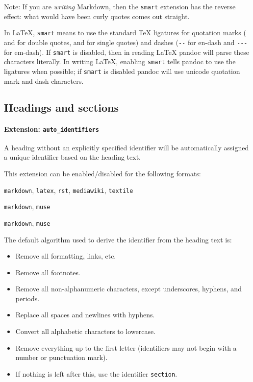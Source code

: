 \documentclass[
  a4paper,
]{article}
\providecommand{\tightlist}{%
  \setlength{\itemsep}{0pt}\setlength{\parskip}{0pt}}
\begin{document}
Note: If you are \emph{writing} Markdown, then the \texttt{smart}
extension has the reverse effect: what would have been curly quotes
comes out straight.

In LaTeX, \texttt{smart} means to use the standard TeX ligatures for
quotation marks (\texttt{\textasciigrave{}\textasciigrave{}} and
\texttt{\textquotesingle{}\textquotesingle{}} for double quotes,
\texttt{\textasciigrave{}} and \texttt{\textquotesingle{}} for single
quotes) and dashes (\texttt{-\/-} for en-dash and \texttt{-\/-\/-} for
em-dash). If \texttt{smart} is disabled, then in reading LaTeX pandoc
will parse these characters literally. In writing LaTeX, enabling
\texttt{smart} tells pandoc to use the ligatures when possible; if
\texttt{smart} is disabled pandoc will use unicode quotation mark and
dash characters.

\hypertarget{headings-and-sections}{%
\subsection{Headings and sections}\label{headings-and-sections}}

\hypertarget{extension-auto_identifiers}{%
\paragraph{\texorpdfstring{Extension:
\texttt{auto\_identifiers}}{Extension: auto\_identifiers}}\label{extension-auto_identifiers}}

A heading without an explicitly specified identifier will be
automatically assigned a unique identifier based on the heading text.

This extension can be enabled/disabled for the following formats:

\begin{description}
\tightlist
\item[input formats]
\texttt{markdown}, \texttt{latex}, \texttt{rst}, \texttt{mediawiki},
\texttt{textile}
\item[output formats]
\texttt{markdown}, \texttt{muse}
\item[enabled by default in]
\texttt{markdown}, \texttt{muse}
\end{description}

The default algorithm used to derive the identifier from the heading
text is:

\begin{itemize}
\tightlist
\item
  Remove all formatting, links, etc.
\item
  Remove all footnotes.
\item
  Remove all non-alphanumeric characters, except underscores, hyphens,
  and periods.
\item
  Replace all spaces and newlines with hyphens.
\item
  Convert all alphabetic characters to lowercase.
\item
  Remove everything up to the first letter (identifiers may not begin
  with a number or punctuation mark).
\item
  If nothing is left after this, use the identifier \texttt{section}.
\end{itemize}
\end{document}
